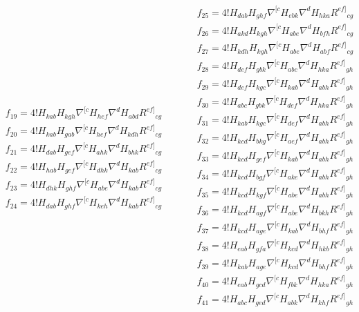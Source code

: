 \documentclass[a4paper,11pt]{article}
\begin{document}
\begin{equation}
\begin{aligned}
&f_{19}=4!H_{kab}H_{kgh}\nabla^{[c}H_{hef}\nabla^dH_{abd}R^{ef]}{}_{cg}\\
&f_{20}=4!H_{kab}H_{gab}\nabla^{[c}H_{hef}\nabla^dH_{kdh}R^{ef]}{}_{cg}\\
&f_{21}=4!H_{dab}H_{gef}\nabla^{[c}H_{ahk}\nabla^dH_{bhk}R^{ef]}{}_{cg}\\
&f_{22}=4!H_{hab}H_{gef}\nabla^{[c}H_{dhk}\nabla^dH_{kab}R^{ef]}{}_{cg}\\
&f_{23}=4!H_{dhk}H_{ghf}\nabla^{[c}H_{abe}\nabla^dH_{kab}R^{ef]}{}_{cg}\\
&f_{24}=4!H_{dab}H_{ghf}\nabla^{[c}H_{keh}\nabla^dH_{kab}R^{ef]}{}_{cg}
\end{aligned}
\qquad
\begin{aligned}
&f_{25}=4!H_{dab}H_{ghf}\nabla^{[c}H_{ebk}\nabla^dH_{hka}R^{ef]}{}_{cg}\\
&f_{26}=4!H_{akd}H_{kgh}\nabla^{[c}H_{abe}\nabla^dH_{bfh}R^{ef]}{}_{cg}\\
&f_{27}=4!H_{kdh}H_{kgh}\nabla^{[c}H_{abe}\nabla^dH_{abf}R^{ef]}{}_{cg}\\
%
&f_{28}=4!H_{def}H_{gbk}\nabla^{[c}H_{abc}\nabla^dH_{hka}R^{ef]}{}_{gh}\\
&f_{29}=4!H_{def}H_{kgc}\nabla^{[c}H_{kab}\nabla^dH_{abh}R^{ef]}{}_{gh}\\
&f_{30}=4!H_{abc}H_{gbk}\nabla^{[c}H_{def}\nabla^dH_{hka}R^{ef]}{}_{gh}\\
&f_{31}=4!H_{kab}H_{kgc}\nabla^{[c}H_{def}\nabla^dH_{abh}R^{ef]}{}_{gh}\\
&f_{32}=4!H_{kcd}H_{bkg}\nabla^{[c}H_{aef}\nabla^dH_{abh}R^{ef]}{}_{gh}\\
&f_{33}=4!H_{kcd}H_{gef}\nabla^{[c}H_{kab}\nabla^dH_{abh}R^{ef]}{}_{gh}\\
&f_{34}=4!H_{kcd}H_{bgf}\nabla^{[c}H_{ake}\nabla^dH_{abh}R^{ef]}{}_{gh}\\
&f_{35}=4!H_{kcd}H_{kgf}\nabla^{[c}H_{abe}\nabla^dH_{abh}R^{ef]}{}_{gh}\\
&f_{36}=4!H_{kcd}H_{agf}\nabla^{[c}H_{abe}\nabla^dH_{bkh}R^{ef]}{}_{gh}\\
&f_{37}=4!H_{kcd}H_{age}\nabla^{[c}H_{kab}\nabla^dH_{bhf}R^{ef]}{}_{gh}\\
&f_{38}=4!H_{eab}H_{gfa}\nabla^{[c}H_{kcd}\nabla^dH_{hkb}R^{ef]}{}_{gh}\\
&f_{39}=4!H_{kab}H_{age}\nabla^{[c}H_{kcd}\nabla^dH_{bhf}R^{ef]}{}_{gh}\\
&f_{40}=4!H_{eab}H_{gcd}\nabla^{[c}H_{fbk}\nabla^dH_{hka}R^{ef]}{}_{gh}\\
&f_{41}=4!H_{abc}H_{ged}\nabla^{[c}H_{abk}\nabla^dH_{khf}R^{ef]}{}_{gh}\\

\end{aligned}
\end{equation}
\end{document}
